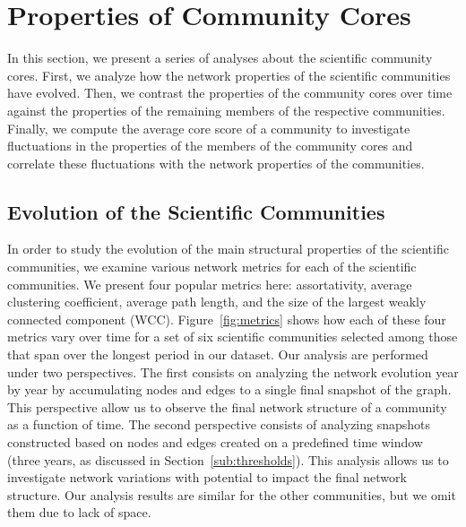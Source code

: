 \section{Properties of Community Cores}

In this section, we present a series of analyses about the scientific community cores. First, we analyze how the network properties of the scientific communities have evolved. 
Then, we contrast the properties of the community cores over time against the properties of the remaining members of the respective communities. 
Finally, we compute the average core score of a community to investigate fluctuations in the properties of the members of the community cores and 
correlate these fluctuations with the network properties of the communities.


\subsection{Evolution of the Scientific Communities}
\label{sub:time}

In order to study the evolution of the main structural properties of the scientific communities, we examine 
various network metrics for each of the scientific communities. We present four popular metrics here: assortativity, average clustering
coefficient, average path length, and the size of the largest weakly connected component (WCC). Figure~\ref{fig:metrics} shows how each of these four metrics vary over time
for a set of six scientific communities selected among those that span over the longest period in our dataset.  Our analysis are performed under two perspectives. The first
consists on analyzing the network evolution year by year by accumulating nodes and edges to a single final snapshot of the graph. This perspective allow us to observe the final
network structure of a community as a function of time. The second perspective consists of analyzing snapshots constructed based on nodes and edges created on a predefined time
window (three years, as discussed in Section~\ref{sub:thresholds}). This analysis allows us to investigate network variations with potential to impact the final network structure.
Our analysis results are similar for the other communities, but we omit them due to lack of space.




